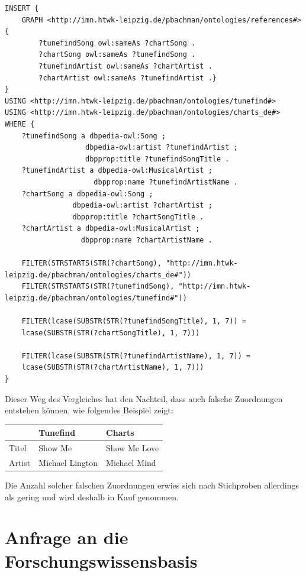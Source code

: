 \documentclass[parskip]{scrartcl}
\begin{document}
\begin{lstlisting}[caption={Offizielle Charts JSON-Format}, label={list:chartsDeJson}]
INSERT {
    GRAPH <http://imn.htwk-leipzig.de/pbachman/ontologies/references#> { 
        ?tunefindSong owl:sameAs ?chartSong .
        ?chartSong owl:sameAs ?tunefindSong .        
        ?tunefindArtist owl:sameAs ?chartArtist .
        ?chartArtist owl:sameAs ?tunefindArtist .}
}
USING <http://imn.htwk-leipzig.de/pbachman/ontologies/tunefind#>
USING <http://imn.htwk-leipzig.de/pbachman/ontologies/charts_de#>
WHERE {
    ?tunefindSong a dbpedia-owl:Song ;
                   dbpedia-owl:artist ?tunefindArtist ;
                   dbpprop:title ?tunefindSongTitle .
    ?tunefindArtist a dbpedia-owl:MusicalArtist ;
                     dbpprop:name ?tunefindArtistName .
    ?chartSong a dbpedia-owl:Song ;
                dbpedia-owl:artist ?chartArtist ;
                dbpprop:title ?chartSongTitle .
    ?chartArtist a dbpedia-owl:MusicalArtist ;
                  dbpprop:name ?chartArtistName .
    
    FILTER(STRSTARTS(STR(?chartSong), "http://imn.htwk-leipzig.de/pbachman/ontologies/charts_de#"))
    FILTER(STRSTARTS(STR(?tunefindSong), "http://imn.htwk-leipzig.de/pbachman/ontologies/tunefind#"))
    
    FILTER(lcase(SUBSTR(STR(?tunefindSongTitle), 1, 7)) =
    lcase(SUBSTR(STR(?chartSongTitle), 1, 7)))
    
    FILTER(lcase(SUBSTR(STR(?tunefindArtistName), 1, 7)) =
    lcase(SUBSTR(STR(?chartArtistName), 1, 7)))
}
\end{lstlisting}

Dieser Weg des Vergleiches hat den Nachteil, dass auch falsche Zuordnungen entstehen können, wie folgendes Beispiel zeigt:\\
\begin{center}
        \begin{tabular}{l|l|l}
             & \textbf{Tunefind} & \textbf{Charts} \\\hline
            Titel & Show Me  & Show Me Love\\
            Artist & Michael Lington & Michael Mind\\
        \end{tabular}
\end{center}

Die Anzahl solcher falschen Zuordnungen erwies sich nach Stichproben allerdings als gering und wird deshalb in Kauf genommen.

\section{Anfrage an die Forschungswissensbasis}
\end{document}
